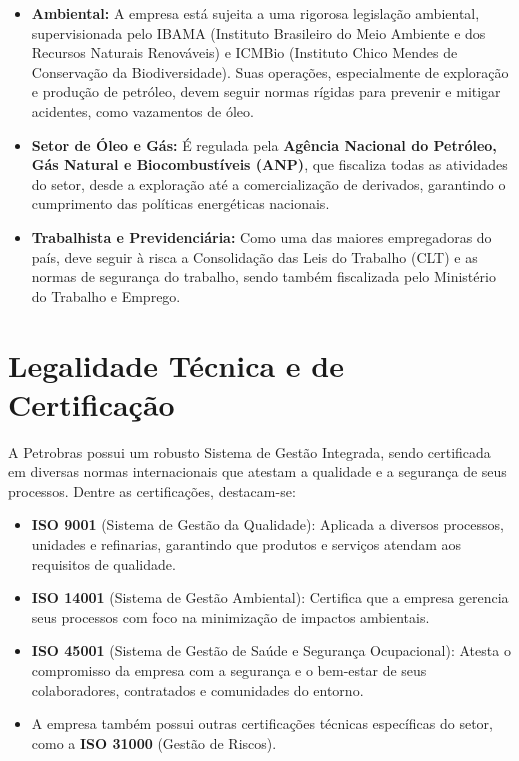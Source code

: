 \documentclass[12pt, a4paper]{article}
\begin{document}
\begin{itemize}
    \item \textbf{Ambiental:} A empresa está sujeita a uma rigorosa legislação ambiental, supervisionada pelo IBAMA (Instituto Brasileiro do Meio Ambiente e dos Recursos Naturais Renováveis) e ICMBio (Instituto Chico Mendes de Conservação da Biodiversidade). Suas operações, especialmente de exploração e produção de petróleo, devem seguir normas rígidas para prevenir e mitigar acidentes, como vazamentos de óleo.
    
    \item \textbf{Setor de Óleo e Gás:} É regulada pela \textbf{Agência Nacional do Petróleo, Gás Natural e Biocombustíveis (ANP)}, que fiscaliza todas as atividades do setor, desde a exploração até a comercialização de derivados, garantindo o cumprimento das políticas energéticas nacionais.
    
    \item \textbf{Trabalhista e Previdenciária:} Como uma das maiores empregadoras do país, deve seguir à risca a Consolidação das Leis do Trabalho (CLT) e as normas de segurança do trabalho, sendo também fiscalizada pelo Ministério do Trabalho e Emprego.
\end{itemize}

\section{Legalidade Técnica e de Certificação}

A Petrobras possui um robusto Sistema de Gestão Integrada, sendo certificada em diversas normas internacionais que atestam a qualidade e a segurança de seus processos. Dentre as certificações, destacam-se:

\begin{itemize}
    \item \textbf{ISO 9001} (Sistema de Gestão da Qualidade): Aplicada a diversos processos, unidades e refinarias, garantindo que produtos e serviços atendam aos requisitos de qualidade.
    
    \item \textbf{ISO 14001} (Sistema de Gestão Ambiental): Certifica que a empresa gerencia seus processos com foco na minimização de impactos ambientais.
    
    \item \textbf{ISO 45001} (Sistema de Gestão de Saúde e Segurança Ocupacional): Atesta o compromisso da empresa com a segurança e o bem-estar de seus colaboradores, contratados e comunidades do entorno.
    
    \item A empresa também possui outras certificações técnicas específicas do setor, como a \textbf{ISO 31000} (Gestão de Riscos).
\end{itemize}
\end{document}
